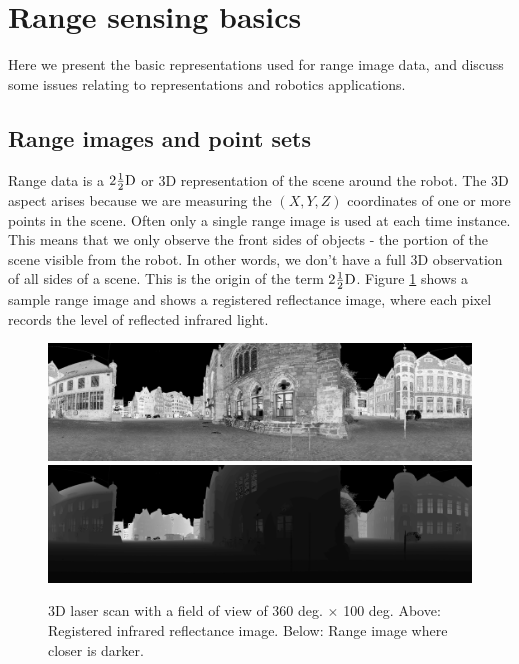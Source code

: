 \documentclass[twocolumn,oneside]{book}
\begin{document}
\section{Range sensing basics \label{sec31.1}}

Here we present the basic representations used for range image data,
and discuss some issues relating to representations and robotics
applications. 

\subsection{Range images and point sets} \label{sec31.1.1}

 Range data is a $2\frac{1}{2}{\rm D}$ or 3D
representation of the scene around the robot.  The 3D aspect arises
because we are measuring the $(X,Y,Z)$ coordinates of one or more
points in the scene.  Often only a single  range
image is used at each time instance.  This means that we only observe
the front sides of objects - the portion of the scene visible from the
robot.  In other words, we don't have a full 3D observation of all
sides of a scene.  This is the origin of the term $2\frac{1}{2}{\rm
  D}$.  Figure \ref{fig23.1} shows a sample range image and shows
a  registered reflectance image,
where each pixel records the level of reflected infrared light.
\begin{figure}
  \includegraphics[width=\linewidth]{BOOKFIGS/scan007_EQUIRECTANGULAR}\\[1ex]
  \includegraphics[width=\linewidth]{BOOKFIGS/scan007_EQUIRECTANGULAR_depth_1}
  \caption{3D laser scan with a field of view of 360 deg. $\times$ 100 deg.
    Above: Registered infrared reflectance image.
    Below: Range image where closer is darker.
\label{fig23.1}}
\end{figure}
\end{document}
